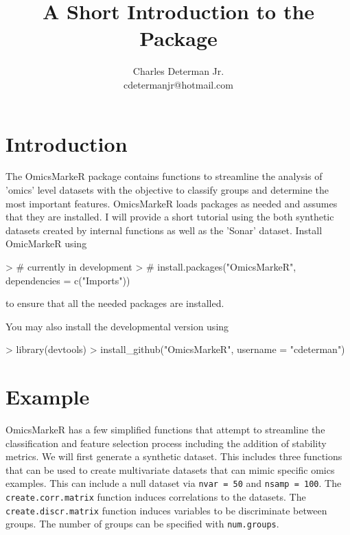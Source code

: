 \documentclass[12pt]{article}
\title{A Short Introduction to the \pkg{OmicsMarkeR} Package}
\author{Charles Determan Jr. \\ cdetermanjr@hotmail.com}
\newcommand{\pkg}[1]{{\fontseries{b}\selectfont #1}}
\renewcommand{\pkg}[1]{{\textsf{#1}}}
\renewenvironment{Schunk}{\vspace{\topsep}}{\vspace{\topsep}}
\begin{document}


\maketitle

\thispagestyle{empty}
  
\vspace{.2in}

\renewcommand{\baselinestretch}{1}

\maketitle
\section{Introduction}
The \pkg{OmicsMarkeR} package contains functions to streamline the analysis of
'omics' level datasets with the objective to classify groups and determine the
most important features. \pkg{OmicsMarkeR} loads packages as needed and assumes 
that they are installed.  I will provide a short tutorial using the both synthetic
datasets created by internal functions as well as the 'Sonar' dataset. 
Install \pkg{OmicMarkeR} using  

\begin{Schunk}
\begin{Sinput}
> # currently in development
> # install.packages("OmicsMarkeR", dependencies = c("Imports"))
\end{Sinput}
\end{Schunk}
to ensure that all the needed packages are installed.

You may also install the developmental version using
\begin{Schunk}
\begin{Sinput}
> library(devtools)
> install_github("OmicsMarkeR", username = "cdeterman")
\end{Sinput}
\end{Schunk}

\maketitle
\section{Example}
\pkg{OmicsMarkeR} has a few simplified functions that attempt to streamline the classification
and feature selection process including the addition of stability metrics. We will first generate a synthetic dataset.  This includes three functions that can be used to create multivariate datasets that can mimic specific omics examples.  This can include a null dataset via {\tt nvar = 50} and {\tt nsamp = 100}.  The {\tt create.corr.matrix} function induces correlations to the datasets.  The {\tt create.discr.matrix} function induces variables to be discriminate between groups.  The number of groups can be specified with {\tt num.groups}. 
\end{document}
